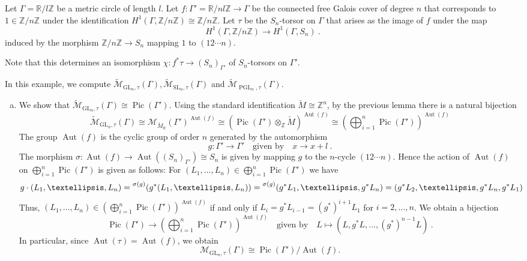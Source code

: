 \documentclass[10pt,a4paper]{amsart}
\DeclareMathOperator{\Aut}{Aut}
\newcommand{\GL}{{\mathrm{GL}}}
\newcommand{\Ga}{\Gamma}
\newcommand{\Mcheck}{{\check{M}}}
\DeclareMathOperator{\PGL}{PGL}
\DeclareMathOperator{\Pic}{Pic}
\newcommand{\R}{\mathbb{R}}
\newcommand{\SL}{{\mathrm{SL}}}
\newcommand{\Z}{\mathbb{Z}}
\newcommand{\ZZ}{\mathbb{Z}}
\newcommand{\calM}{\mathcal{M}}
\newcommand{\wmc}[1]{{\widetilde{\mathcal{#1}}}}
\begin{document}
\begin{example} 
\label{ex:computation of MGLn using cover} Let $\Gamma = \R / l\ZZ$ be a metric circle of length $l$. Let $f: \Gamma' = \R/nl\Z \to \Gamma$ be the connected free Galois cover of degree $n$ that corresponds to $1 \in \Z/n\Z$ under the identification $H^1(\Gamma,\Z/n\Z) \cong \Z / n\Z$.
Let $\tau$ be the $S_n$-torsor on $\Gamma$ that arises as the image of $f$ under the map
\[
H^1(\Gamma,\Z/n\Z) \longrightarrow H^1(\Gamma,S_n) \ .
\]
induced by the morphism $\Z/n\Z\to S_n$ mapping $1$ to $(1 2\cdots n)$.

Note that this determines an isomorphism $\chi: f^* \tau \to (S_n)_{\Gamma'}$ of $S_n$-torsors on $\Ga'$.

In this example, we compute $\wmc M_{\GL_n, \tau}(\Gamma), \wmc M_{\SL_n,\tau}(\Gamma)$ and $\wmc M_{\PGL_n,\tau }(\Gamma)$.

\begin{enumerate}[(a)]
    \item
    
    We show that $\wmc M_{\GL_n, \tau}(\Ga) \cong \Pic(\Gamma')$. Using the standard identification $\Mcheck \cong \Z^n$, by the previous lemma there is a natural bijection
    \[
    \wmc M_{\GL_n, \tau}(\Ga) \cong \calM_{\Mcheck_\R}(\Gamma')^{\Aut(f)} \cong (\Pic(\Gamma') \otimes_\Z \Mcheck)^{\Aut(f)} \cong \left(\bigoplus_{i =1}^n \Pic(\Gamma')\right)^{\Aut(f)}
    \]
    The group $\Aut(f)$ is the cyclic group of order $n$ generated by the automorphism $$g: \Gamma' \to \Gamma' \quad\text{given by}\quad x \to x + l\ . $$ The morphism $\sigma: \Aut(f) \to \Aut((S_n)_{\Gamma'}) \cong S_n$ is given by mapping $g$ to the $n$-cycle $(1 2\cdots n)$. Hence the action of $\Aut(f)$ on $\bigoplus_{i =1}^n \Pic(\Gamma')$ is given as follows: For $(L_1,\dots,L_n) \in \bigoplus_{i =1}^n \Pic(\Gamma')$ we have
    \[
    g \cdot (L_1,\dots,L_n) =  \prescript{\sigma(g)}{}{(g^{*}(L_1,\ldots,L_n))} = \prescript{\sigma(g)}{}{(g^{*}L_1,\ldots,g^{*}L_n)}= (g^{*}L_2,\ldots,g^{*}L_n,g^{*}L_1)
    \]
    Thus, $(L_1,\dots,L_n) \in (\bigoplus_{i =1}^n \Pic(\Gamma'))^{\Aut(f)}$ if and only if $L_i = g^{*}L_{i-1} = (g^{*})^{i+1}L_1$ for $i=2,\ldots,n$. We obtain a bijection
    \[
    \Pic(\Gamma') \longrightarrow \left(\bigoplus_{i =1}^n \Pic(\Gamma')\right)^{\Aut(f)} \quad\text{given by}\quad  L \mapsto (L,g^{*}L,\dots,(g^{*})^{n-1}L) \ .
    \]
    In particular, since $\Aut(\tau) = \Aut(f)$, we obtain 
    \[
    \calM_{\GL_n,\tau} (\Gamma) \cong \Pic(\Gamma')/ \Aut(f).
    \]


\end{enumerate}
\end{example}
\end{document}
